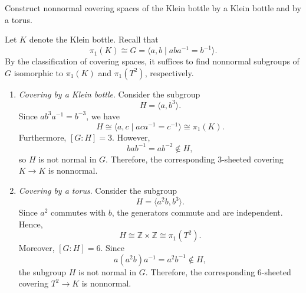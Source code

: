 	\begin{exercise}[Hatcher 1.3.20]
		Construct nonnormal covering spaces of the Klein bottle by a Klein bottle and by a torus.
	\end{exercise}
	\begin{solution}
		Let $K$ denote the Klein bottle. Recall that
		\begin{equation}
			\pi_1(K) \cong G
			= \langle a,b \mid aba^{-1} = b^{-1} \rangle.
		\end{equation}
		By the classification of covering spaces, it suffices to find
		nonnormal subgroups of $G$ isomorphic to $\pi_1(K)$ and
		$\pi_1(T^2)$, respectively.

		\begin{enumerate}
			\item \textit{Covering by a Klein bottle}.
				Consider the subgroup
				\begin{equation}
					H = \langle a,b^3 \rangle.
				\end{equation}
				Since $ab^3a^{-1} = b^{-3}$, we have
				\begin{equation}
					H \cong \langle a,c \mid aca^{-1} = c^{-1} \rangle
					\cong \pi_1(K).
				\end{equation}
				Furthermore, $[G:H] = 3$. However,
				\begin{equation}
					bab^{-1} = ab^{-2} \notin H,
				\end{equation}
				so $H$ is not normal in $G$. Therefore, the corresponding
				$3$-sheeted covering $K \to K$ is nonnormal.

			\item \textit{Covering by a torus}.
				Consider the subgroup
				\begin{equation}
					H = \langle a^2b,b^3 \rangle.
				\end{equation}
				Since $a^2$ commutes with $b$, the generators commute
				and are independent. Hence,
				\begin{equation}
					H \cong \mathbb{Z} \times \mathbb{Z}
					\cong \pi_1(T^2).
				\end{equation}
				Moreover, $[G:H] = 6$. Since
				\begin{equation}
					a(a^2b)a^{-1} = a^2b^{-1} \notin H,
				\end{equation}
				the subgroup $H$ is not normal in $G$. Therefore, the
				corresponding $6$-sheeted covering $T^2 \to K$ is nonnormal.
		\end{enumerate}
	\end{solution}


